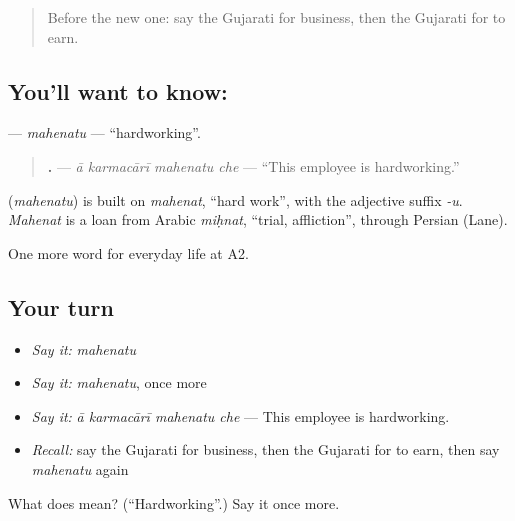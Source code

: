 \label{lesson:GU-C247-mahenatu}



\begin{quote}
Before the new one: say the Gujarati for business, then the Gujarati for to earn.
\end{quote}

\subsection*{You'll want to know: }
\textbf{} — \emph{mahenatu} — \textquotedblleft{}hardworking\textquotedblright{}.

\begin{quote}
\textbf{   .} — \emph{ā karmacārī mahenatu che} — \textquotedblleft{}This employee is hardworking.\textquotedblright{}
\end{quote}

\begin{cousinweb}
\textbf{} (\emph{mahenatu}) is built on \emph{mahenat}, \textquotedblleft{}hard work\textquotedblright{}, with the adjective suffix \emph{-u}. \emph{Mahenat} is a loan from Arabic \emph{miḥnat}, \textquotedblleft{}trial, affliction\textquotedblright{}, through Persian (Lane).
\end{cousinweb}

\begin{grammarlens}[title={What you've built}]
One more word for everyday life at A2.
\end{grammarlens}

\subsection*{Your turn}
\begin{itemize}
\raggedright
  \item \emph{Say it:} \emph{mahenatu}
  \item \emph{Say it:} \emph{mahenatu}, once more
  \item \emph{Say it:} \emph{ā karmacārī mahenatu che} — This employee is hardworking.
  \item \emph{Recall:} say the Gujarati for business, then the Gujarati for to earn, then say \emph{mahenatu} again
\end{itemize}

\begin{tcolorbox}[breakable,colback=teal!4,colframe=teal!35!black,title={Before you move on}]
What does  mean? (\textquotedblleft{}Hardworking\textquotedblright{}.) Say it once more.
\end{tcolorbox}

